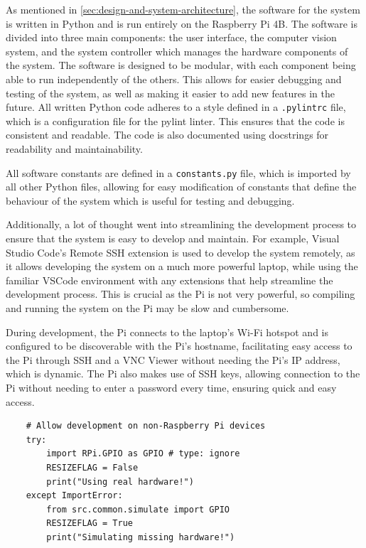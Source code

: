As mentioned in \autoref{sec:design-and-system-architecture}, the software for the system is written in Python and is run entirely on the Raspberry Pi 4B. The software is divided into three main components: the user interface, the computer vision system, and the system controller which manages the hardware components of the system. The software is designed to be modular, with each component being able to run independently of the others. This allows for easier debugging and testing of the system, as well as making it easier to add new features in the future. All written Python code adheres to a style defined in a \texttt{.pylintrc} file, which is a configuration file for the pylint \cite{pylint} linter. This ensures that the code is consistent and readable. The code is also documented using docstrings for readability and maintainability.

All software constants are defined in a \texttt{constants.py} file, which is imported by all other Python files, allowing for easy modification of constants that define the behaviour of the system which is useful for testing and debugging.

Additionally, a lot of thought went into streamlining the development process to ensure that the system is easy to develop and maintain. For example, Visual Studio Code's \cite{vscode} Remote SSH extension is used to develop the system remotely, as it allows developing the system on a much more powerful laptop, while using the familiar VSCode environment with any extensions that help streamline the development process. This is crucial as the Pi is not very powerful, so compiling and running the system on the Pi may be slow and cumbersome.

During development, the Pi connects to the laptop's Wi-Fi hotspot and is configured to be discoverable with the Pi's hostname, facilitating easy access to the Pi through SSH and a VNC Viewer without needing the Pi's IP address, which is dynamic. The Pi also makes use of SSH keys, allowing connection to the Pi without needing to enter a password every time, ensuring quick and easy access.

\begin{minipage}[H]{\textwidth}
    \centering
    \begin{verbatim}
    # Allow development on non-Raspberry Pi devices
    try:
        import RPi.GPIO as GPIO # type: ignore
        RESIZEFLAG = False
        print("Using real hardware!")
    except ImportError:
        from src.common.simulate import GPIO
        RESIZEFLAG = True
        print("Simulating missing hardware!")
    \end{verbatim}
    \label{code:cross-platform-gpio}
\end{minipage}

